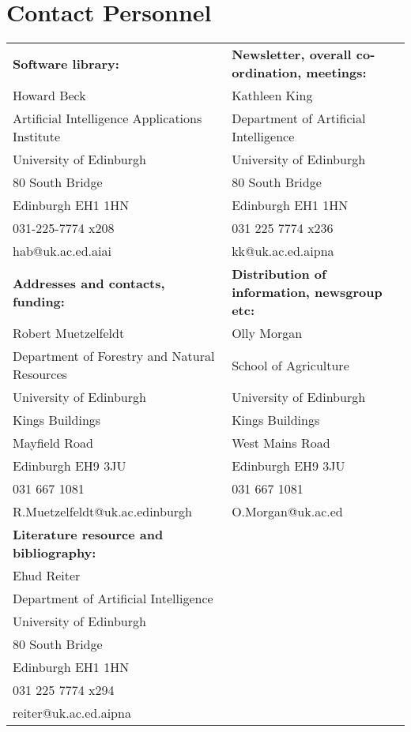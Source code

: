 \section{Contact Personnel}
\begin{tabular}{l|l}
{\bf Software library:} & {\bf Newsletter, overall co-ordination,
meetings:}\\ 
Howard Beck &  Kathleen King\\
Artificial Intelligence Applications Institute &  Department of
Artificial Intelligence \\
University of Edinburgh & University of Edinburgh\\
80 South Bridge & 80 South Bridge\\
Edinburgh EH1 1HN & Edinburgh EH1 1HN\\
031-225-7774 x208 & 031 225 7774 x236\\
hab@uk.ac.ed.aiai & kk@uk.ac.ed.aipna\\
\hline
{\bf Addresses and contacts, funding:} & {\bf Distribution of
information, newsgroup etc:}\\ 
Robert Muetzelfeldt & Olly Morgan\\
Department of Forestry and Natural Resources &  School of Agriculture\\
University of Edinburgh & University of Edinburgh\\
Kings Buildings & Kings Buildings\\
 Mayfield Road &  West Mains Road\\
Edinburgh   EH9 3JU & Edinburgh   EH9 3JU\\
 031 667 1081 & 031 667 1081\\
 R.Muetzelfeldt@uk.ac.edinburgh &  O.Morgan@uk.ac.ed\\
\hline
{\bf Literature resource and bibliography:} &\\
 Ehud Reiter &\\
 Department of Artificial Intelligence &\\
 University of Edinburgh &\\
 80 South Bridge &\\
 Edinburgh EH1 1HN &\\
 031 225 7774 x294 &\\
reiter@uk.ac.ed.aipna &


\end{tabular}






